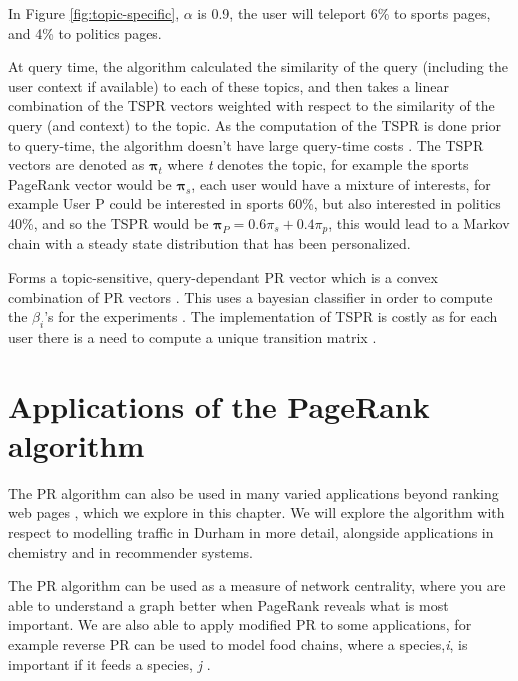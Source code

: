 \documentclass[11pt]{report}
\begin{document}
In Figure \ref{fig:topic-specific}, $\alpha$ is 0.9, the user will teleport 6\% to sports pages, and 4\% to politics pages.

At query time, the algorithm calculated the similarity of the query (including the user context if available) to each of these topics, and then takes a linear combination of the TSPR vectors weighted with respect to the similarity of the query (and context) to the topic. As the computation of the TSPR is done prior to query-time, the algorithm doesn't have large query-time costs \cite{haveliwala2002topic}.  The TSPR vectors are denoted as $\boldsymbol{\pi}_t$ where \textit{t} denotes the topic, for example the sports PageRank vector would be $\boldsymbol{\pi}_s$, each user would have a mixture of interests, for example User P could be interested in sports 60\%, but also interested in politics 40\%, and so the TSPR would be $\boldsymbol{\pi}_P=0.6\pi_s+0.4\pi_p$, this would lead to a Markov chain with a steady state distribution that has been personalized. 


Forms a topic-sensitive, query-dependant PR vector which is a convex combination of PR vectors \cite{langville}. This uses a bayesian classifier in order to compute the $\beta_i$'s for the experiments \cite{langville}.   The implementation of TSPR is costly as for each user there is a need to compute a unique transition matrix \cite{manning}. 



\chapter{Applications of the PageRank algorithm} \label{chap:Applications}

The PR algorithm can also be used in many varied applications beyond ranking web pages \cite{gleich2015pagerank}, which we explore in this chapter. We will explore the algorithm with respect to modelling traffic in Durham in more detail, alongside applications in chemistry and in recommender systems. 

The PR algorithm can be used as a measure of network centrality, where you are able to understand a graph better when PageRank reveals what is most important. We are also able to apply modified PR to some applications, for example reverse PR can be used to model food chains, where a species,\textit{i}, is important if it feeds a species, \textit{j} \cite{allesina2009googling}. 
\end{document}
